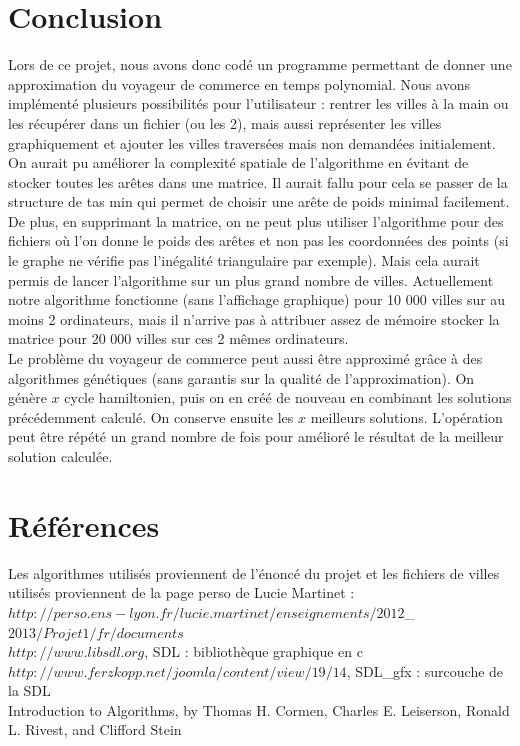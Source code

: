 \documentclass[a4paper,11pt]{article}
\begin{document}
\section{Conclusion} %

Lors de ce projet, nous avons donc codé un programme permettant de donner une approximation du voyageur de commerce en temps polynomial. Nous avons implémenté plusieurs possibilités pour l'utilisateur : rentrer les villes à la main ou les récupérer dans un fichier (ou les 2), mais aussi représenter les villes graphiquement et ajouter les villes traversées mais non demandées initialement.\\
On aurait pu améliorer la complexité spatiale de l'algorithme en évitant de stocker toutes les arêtes dans une matrice. Il aurait fallu pour cela se passer de la structure de tas min qui permet de choisir une arête de poids minimal facilement. De plus, en supprimant la matrice, on ne peut plus utiliser l'algorithme pour des fichiers où l'on donne le poids des arêtes et non pas les coordonnées des points (si le graphe ne vérifie pas l'inégalité triangulaire par exemple). Mais cela aurait permis de lancer l'algorithme sur un plus grand nombre de villes. Actuellement notre algorithme fonctionne (sans l'affichage graphique) pour 10 000 villes sur au moins 2 ordinateurs, mais il n'arrive pas à attribuer assez de mémoire stocker la matrice pour 20 000 villes sur ces 2 mêmes ordinateurs.\\
Le problème du voyageur de commerce peut aussi être approximé grâce à des algorithmes génétiques (sans garantis sur la qualité de l'approximation). 
On génère $x$ cycle hamiltonien, puis on en créé de nouveau en combinant les solutions précédemment calculé. On conserve ensuite les $x$ meilleurs solutions. L'opération peut être répété un grand nombre de fois pour amélioré le résultat de la meilleur solution calculée.


\section{Références}

Les algorithmes utilisés proviennent de l'énoncé du projet et les fichiers de villes utilisés proviennent de la page perso de Lucie Martinet : \\
$http://perso.ens-lyon.fr/lucie.martinet/enseignements/2012$\_$2013/Projet1/fr/documents$\\
\label{SDL}
$http://www.libsdl.org$, SDL : bibliothèque graphique en c\\
\label{SDLgfx}
$http://www.ferzkopp.net/joomla/content/view/19/14$, SDL\_gfx : surcouche de la SDL\\
Introduction to Algorithms, by Thomas H. Cormen, Charles E. Leiserson, Ronald L. Rivest, and Clifford Stein
\end{document}

